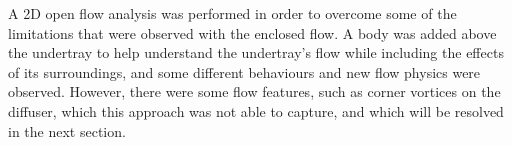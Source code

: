 \noindent A 2D open flow analysis was performed in order to overcome some of the limitations that were observed with the enclosed flow. A body was added above the undertray to help understand the undertray's flow while including the effects of its surroundings, and some different behaviours and new flow physics were observed. However, there were some flow features, such as corner vortices on the diffuser, which this approach was not able to capture, and which  will be resolved in the next section.



